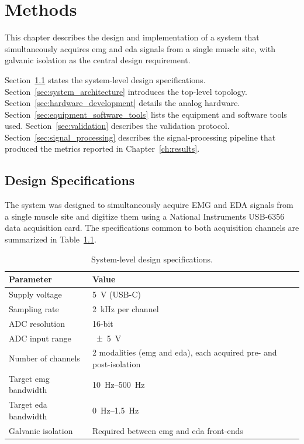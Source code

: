 \chapter{Methods}
\label{ch:methods}
This chapter describes the design and implementation of a system that simultaneously acquires \gls{emg} and \gls{eda} signals from a single muscle site, with galvanic isolation as the central design requirement.

Section~\ref{sec:design_specifications} states the system-level design specifications. Section~\ref{sec:system_architecture} introduces the top-level topology. Section~\ref{sec:hardware_development} details the analog hardware. Section~\ref{sec:equipment_software_tools} lists the equipment and software tools used. Section~\ref{sec:validation} describes the validation protocol. Section~\ref{sec:signal_processing} describes the signal-processing pipeline that produced the metrics reported in Chapter~\ref{ch:results}.

\section{Design Specifications}
\label{sec:design_specifications}
The system was designed to simultaneously acquire EMG and EDA signals from a single muscle site and digitize them using a National Instruments USB-6356 data acquisition card. The specifications common to both acquisition channels are summarized in Table~\ref{tab:design_specs}.

\begin{table}[!htbp]
\centering
\caption{System-level design specifications.}
\label{tab:design_specs}
\begin{tabularx}{0.7\textwidth}{l X}
\toprule
\textbf{Parameter}         & \textbf{Value} \\
\midrule
Supply voltage             & \SI{5}{\volt} (USB-C) \\
Sampling rate              & \SI{2}{\kilo\hertz} per channel \\
ADC resolution             & 16-bit \\
ADC input range            & \SI{\pm 5}{\volt} \\
Number of channels         & 2 modalities (\gls{emg} and \gls{eda}), each acquired pre- and post-isolation \\
Target \gls{emg} bandwidth & \SIrange{10}{500}{\hertz} \\
Target \gls{eda} bandwidth & \SIrange{0}{1.5}{\hertz} \\
Galvanic isolation         & Required between \gls{emg} and \gls{eda} front-ends \\
\bottomrule
\end{tabularx}
\end{table}

